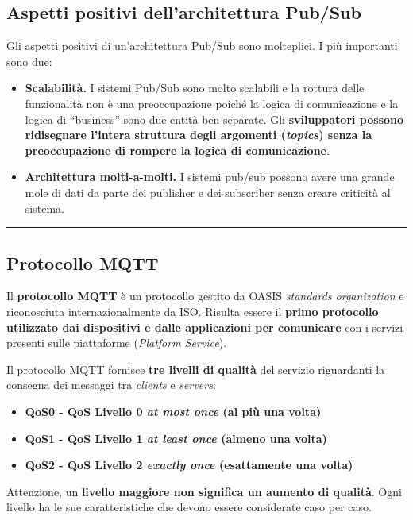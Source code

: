 \documentclass[a4paper]{article}
\newcommand{\longline}{\noindent\rule{\textwidth}{0.4pt}}
\newcommand{\dquotes}[1]{``#1''}
\begin{document}
	\subsection{Aspetti positivi dell'architettura Pub/Sub}
	
	Gli aspetti positivi di un'architettura Pub/Sub sono molteplici. I più importanti sono due:
	\begin{itemize}
		\item \textcolor{Green4}{\textbf{Scalabilità.}} I sistemi Pub/Sub sono molto scalabili e la rottura delle funzionalità non è una preoccupazione poiché la logica di comunicazione e la logica di \dquotes{business} sono due entità ben separate. Gli \textbf{sviluppatori possono ridisegnare l'intera struttura degli argomenti (\emph{topics}) senza la preoccupazione di rompere la logica di comunicazione}.
		
		\item \textcolor{Green4}{\textbf{Architettura molti-a-molti.}} I sistemi pub/sub possono avere una grande mole di dati da parte dei publisher e dei subscriber senza creare criticità al sistema.
	\end{itemize}
	
	\longline
	
	\subsection{Protocollo MQTT}
	
	Il \textcolor{Red3}{\textbf{protocollo MQTT}} è un protocollo gestito da OASIS \emph{standards organization} e riconosciuta internazionalmente da ISO. Risulta essere il \textbf{primo protocollo utilizzato dai dispositivi e dalle applicazioni per comunicare} con i servizi presenti sulle piattaforme (\emph{Platform Service}).\newline
	
	\noindent
	Il protocollo MQTT fornisce \textbf{tre livelli di qualità} del servizio riguardanti la consegna dei messaggi tra \emph{clients} e \emph{servers}:
	\begin{itemize}
		\item \textbf{QoS0 - QoS Livello 0 \emph{at most once} (al più una volta)}
		
		\item \textbf{QoS1 - QoS Livello 1 \emph{at least once} (almeno una volta)}
		
		\item \textbf{QoS2 - QoS Livello 2 \emph{exactly once} (esattamente una volta)}
	\end{itemize}
	Attenzione, un \textbf{livello maggiore non significa un aumento di qualità}. Ogni livello ha le sue caratteristiche che devono essere considerate caso per caso.\newline
	
\end{document}
